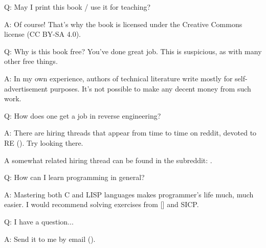 \par Q: May I print this book / use it for teaching?
\par A: Of course! That's why the book is licensed under the Creative Commons license (CC BY-SA 4.0).

\par Q: Why is this book free? You've done great job. This is suspicious, as with many other free things.
\par A: In my own experience, authors of technical literature write mostly for self-advertisement purposes. It's not possible to make any decent money from such work.

\par Q: How does one get a job in reverse engineering?
\par A: There are hiring threads that appear from time to time on reddit, devoted to RE\FNURLREDDIT{}
(\RedditHiringThread{}).
Try looking there.

A somewhat related hiring thread can be found in the  subreddit: \NetsecHiringThread{}.

\par Q: How can I learn programming in general?
\par A: Mastering both C and LISP languages makes programmer's life much, much easier.
I would recommend solving exercises from [\KRBook] and \ac{SICP}.

\par Q: I have a question...
\par A: Send it to me by email (\EMAIL).
